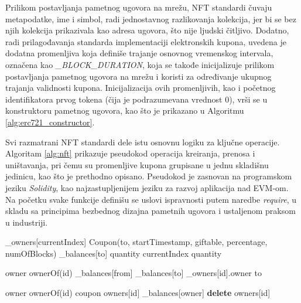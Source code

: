 Prilikom postavljanja pametnog ugovora na mrežu, NFT standardi čuvaju metapodatke, ime i simbol, radi jednostavnog razlikovanja kolekcija, jer bi se bez njih kolekcija prikazivala kao adresa ugovora, što nije ljudski čitljivo. Dodatno, radi prilagođavanja standarda implementaciji elektronskih kupona, uvedena je dodatna promenljiva koja definiše trajanje osnovnog vremenskog intervala, označena kao \textit{\_BLOCK\_DURATION}, koja se takođe inicijalizuje prilikom postavljanja pametnog ugovora na mrežu i koristi za određivanje ukupnog trajanja validnosti kupona. Inicijalizacija ovih promenljivih, kao i početnog identifikatora prvog tokena (čija je podrazumevana vrednost 0), vrši se u konstruktoru pametnog ugovora, kao što je prikazano u Algoritmu \ref{alg:erc721_constructor}.

Svi razmatrani NFT standardi dele istu osnovnu logiku za ključne operacije. Algoritam \ref{alg:nft} prikazuje pseudokod operacija kreiranja, prenosa i uništavanja, pri čemu su promenljive kupona grupisane u jednu skladišnu jedinicu, kao što je prethodno opisano. Pseudokod je zasnovan na programskom jeziku \textit{Solidity}, kao najzastupljenijem jeziku za razvoj aplikacija nad EVM-om. Na početku svake funkcije definišu se uslovi ispravnosti putem naredbe \textit{require}, u skladu sa principima bezbednog dizajna pametnih ugovora i ustaljenom praksom u industriji.

\begin{algorithm}
\caption{Osnovna logika funkcija kreiranja, prenosa i uništavanja koje e-kupon implementira primenom odgovarajućih NFT standarda}
\label{alg:nft}
\begin{algorithmic}[1]
    \State \_owners[currentIndex] \Eq Coupon(to, startTimestamp, giftable, percentage, numOfBlocks)
    \State \_balances[to] \PlusEq quantity
    \State currentIndex \PlusEq quantity
\EndFunction
\end{algorithmic}
\begin{algorithmic}[1]
    \State owner \Eq ownerOf(id)
    \State \_balances[from]\MinusMinus
    \State \_balances[to]\PlusPlus
    \State \_owners[id].owner \Eq to
\EndFunction
\end{algorithmic}
\begin{algorithmic}[1]
    \State owner \Eq ownerOf(id)
    \State coupon \Eq owners[id]
    \State \_balances[owner]\MinusMinus
    \State \textbf{delete} owners[id]
\EndFunction
\end{algorithmic}
\end{algorithm}

